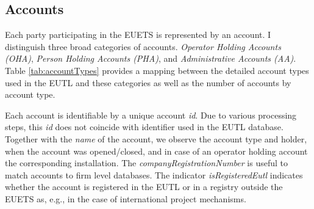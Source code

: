 \documentclass[authoryear]{elsarticle}
\begin{document}
\subsection{Accounts}
Each party participating in the EUETS is represented by an account. I distinguish three broad categories of accounts. \emph{Operator Holding Accounts (OHA)}, \emph{Person Holding Accounts (PHA)}, and \emph{Administrative Accounts (AA)}. Table \ref{tab:accountTypes} provides a mapping between the detailed account types used in the EUTL and these categories as well as the number of accounts by account type.

Each account is identifiable by a unique account \textit{id}. Due to various processing steps, this \textit{id} does not coincide with identifier used in the EUTL database. Together with the \textit{name} of the account, we observe the account type and holder, when the account was opened/closed, and in case of an operator holding account the corresponding installation. The \textit{companyRegistrationNumber} is useful to match accounts to firm level databases. The indicator \textit{isRegisteredEutl} indicates whether the account is registered in the EUTL or in a registry outside the EUETS as, e.g., in the case of international project mechanisms. 
\end{document}
